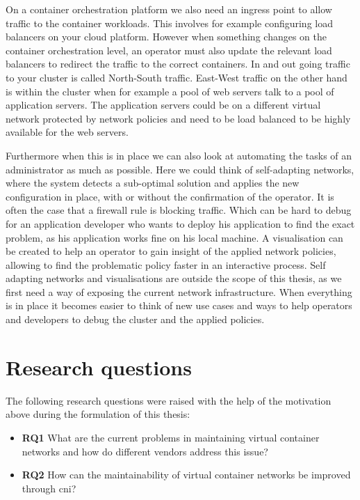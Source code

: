 On a container orchestration platform we also need an ingress point to allow traffic to the container workloads. This involves for example configuring load balancers on your cloud platform. However when something changes on the container orchestration level, an operator must also update the relevant load balancers to redirect the traffic to the correct containers. In and out going traffic to your cluster is called North-South traffic. East-West traffic on the other hand is within the cluster when for example a pool of web servers talk to a pool of application servers. The application servers could be on a different virtual network protected by network policies and need to be load balanced to be highly available for the web servers.

Furthermore when this is in place we can also look at automating the tasks of an administrator as much as possible. Here we could think of self-adapting networks, where the system detects a sub-optimal solution and applies the new configuration in place, with or without the confirmation of the operator. It is often the case that a firewall rule is blocking traffic. Which can be hard to debug for an application developer who wants to deploy his application to find the exact problem, as his application works fine on his local machine. A visualisation can be created to help an operator to gain insight of the applied network policies, allowing to find the problematic policy faster in an interactive process. Self adapting networks and visualisations are outside the scope of this thesis, as we first need a way of exposing the current network infrastructure. When everything is in place it becomes easier to think of new use cases and ways to help operators and developers to debug the cluster and the applied policies.

\section{Research questions}
\label{sec:research-questions}
The following research questions were raised with the help of the motivation above during the formulation of this thesis:
\begin{itemize}
    \item \textbf{RQ1} What are the current problems in maintaining virtual container networks and how do different vendors address this issue?
    \item \textbf{RQ2} How can the maintainability of virtual container networks be improved through \gls{cni}?   
\end{itemize}

